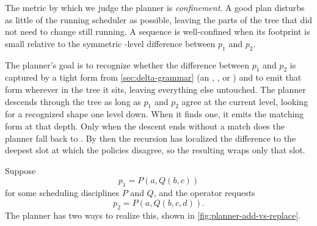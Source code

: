 The metric by which we judge the planner is \emph{confinement}.
A good plan disturbs as little of the running scheduler as possible, leaving the parts of the tree that did not need to change still running.
A sequence is well-confined when its footprint is small relative to the symmetric \pol-level difference between \(p_1\) and \(p_2\).

The planner's goal is to recognize whether the difference between \(p_1\) and \(p_2\) is captured by a tight form from \cref{sec:delta-grammar} (an \Add, \Remove, or \ChangeMeta) and to emit that form wherever in the tree it sits, leaving everything else untouched.
The planner descends through the tree as long as \(p_1\) and \(p_2\) agree at the current level, looking for a recognized shape one level down.
When it finds one, it emits the matching form at that depth.
Only when the descent ends without a match does the planner fall back to \Replace.
By then the recursion has localized the difference to the deepest slot at which the policies disagree, so the resulting \Replace{} wraps only that slot.

Suppose
\[
p_1 = P(a, Q(b, c))
\]
for some scheduling disciplines \(P\) and \(Q\), and the operator requests
\[
p_2 = P(a, Q(b, c, d)).
\]
The planner has two ways to realize this, shown in \cref{fig:planner-add-vs-replace}.

